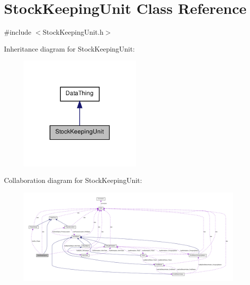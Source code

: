 \hypertarget{class_stock_keeping_unit}{
\section{StockKeepingUnit Class Reference}
\label{class_stock_keeping_unit}
}


{\ttfamily \#include $<$StockKeepingUnit.h$>$}



Inheritance diagram for StockKeepingUnit:\nopagebreak
\begin{figure}[H]
\begin{center}
\leavevmode
\includegraphics[width=170pt]{class_stock_keeping_unit__inherit__graph}
\end{center}
\end{figure}


Collaboration diagram for StockKeepingUnit:\nopagebreak
\begin{figure}[H]
\begin{center}
\leavevmode
\includegraphics[width=400pt]{class_stock_keeping_unit__coll__graph}
\end{center}
\end{figure}
